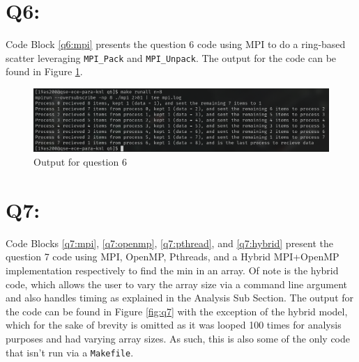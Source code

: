 \documentclass[11pt]{article}
\begin{document}
\section*{Q6:}

Code Block \ref{q6:mpi} presents the question 6 code using MPI to do a ring-based scatter leveraging \texttt{MPI\_Pack} and \texttt{MPI\_Unpack}.
The output for the code can be found in Figure \ref{fig:q6}.



\begin{figure}[ht]
\centering
    \includegraphics[width=\textwidth]{./images/q6.png}
\caption{Output for question 6}
\label{fig:q6}
\end{figure}

\section*{Q7:}

Code Blocks \ref{q7:mpi}, \ref{q7:openmp}, \ref{q7:pthread}, and \ref{q7:hybrid} present the question 7 code using MPI, OpenMP, Pthreads, and a Hybrid MPI+OpenMP implementation respectively to find the min in an array.
Of note is the hybrid code, which allows the user to vary the array size via a command line argument and also handles timing as explained in the Analysis Sub Section.
The output for the code can be found in Figure \ref{fig:q7} with the exception of the hybrid model, which for the sake of brevity is omitted as it was looped 100 times for analysis purposes and had varying array sizes.
As such, this is also some of the only code that isn't run via a \texttt{Makefile}.





\end{document}

